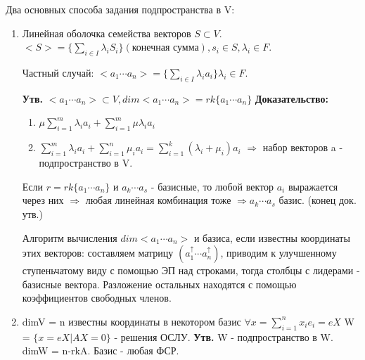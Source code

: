 \documentclass[12pt]{article}
\begin{document}
Два основных способа задания подпространства в V:
\begin{enumerate}
\item Линейная оболочка семейства векторов $S\subset V$. $<S>=\{\sum_{i\in I}\lambda_i S_i\} (\text{конечная сумма}), s_i\in S, \lambda_i\in F.$ \newline

Частный случай: $<a_1\cdots a_n>=\{\sum_{i\in I}\lambda_i a_i\} \lambda_i \in F$. \newline

\textbf{Утв.} $<a_1\cdots a_n> \subset V, dim<a_1\cdots a_n> = rk\{a_1\cdots a_n\}$
\newline \textbf{Доказательство:} \begin{enumerate} 
\item $\mu\sum_{i=1}^m\lambda_i a_i + \sum_{i=1}^m\mu\lambda_i a_i$
\item $\sum_{i=1}^m\lambda_i a_i + \sum_{i=1}^n\mu_i a_i =\sum_{i=1}^k (\lambda_i + \mu_i )a_i$ $\Rightarrow$ набор векторов a - подпространство в V. 
\end{enumerate}
Если $r=rk\{a_1\cdots a_n\}$ и $a_k\cdots a_s$ - базисные, то любой вектор $a_i$ выражается через них $\Rightarrow$ любая линейная комбинация тоже $\Rightarrow a_k\cdots a_s$ базис. (конец док. утв.)

Алгоритм вычисления $dim<a_1\cdots a_n>$ и базиса, если известны координаты этих векторов: составляем матрицу $(a_1^{\uparrow}\cdots a_n^{\uparrow})$, приводим к улучшенному ступеньчатому виду с помощью ЭП над строками, тогда столбцы с лидерами - базисные вектора. Разложение остальных находятся с помощью коэффициентов свободных членов.

\item dimV = n известны координаты в некотором базис $\forall x=\sum_{i=1}^n x_i e_i = eX$
W = $\{x=eX | AX = 0\}$ - решения ОСЛУ. \newline
\textbf{Утв.} W - подпространство в W. dimW = n-rkA. Базис - любая ФСР. 
\end{enumerate}
\end{document}
